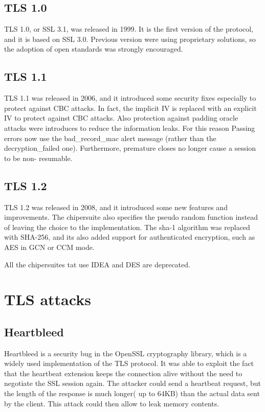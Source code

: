 \subsection{TLS 1.0}
TLS 1.0, or SSL 3.1, was released in 1999. It is the first version of
the protocol, and it is based on SSL 3.0. Previous version were using
proprietary solutions, so the adoption of open standards was strongly
encouraged.

\subsection{TLS 1.1}
TLS 1.1 was released in 2006, and it introduced some security fixes
especially to protect against CBC attacks. In fact, the implicit
IV is replaced with an explicit IV to protect against CBC attacks.
Also protection against padding oracle attacks were introduces to
reduce the information leaks. For this reason Passing errors now use
the bad\_record\_mac alert message (rather than the decryption\_failed
one). Furthermore, premature closes no longer cause a session to be non-
resumable.

\subsection{TLS 1.2}
TLS 1.2 was released in 2008, and it introduced some new features and 
improvements. The chipersuite also specifies the pseudo random
function instead of leaving the choice to the implementation. The
sha-1 algorithm was replaced with SHA-256, and its also added support
for authenticated encryption, such as AES in GCN or CCM mode.

All the chipersuites tat use IDEA and DES are deprecated.

\section{TLS attacks}
\subsection{Heartbleed}
Heartbleed is a security bug in the OpenSSL cryptography library,
which is a widely used implementation of the TLS protocol. It was able
to exploit the fact that the heartbeat extension keeps the connection
alive without the need to negotiate the SSL session again. The
attacker could send a heartbeat request, but the length of the 
response is much longer( up to 64KB) than the actual data sent by the
client. This attack could then allow to leak memory contents.
